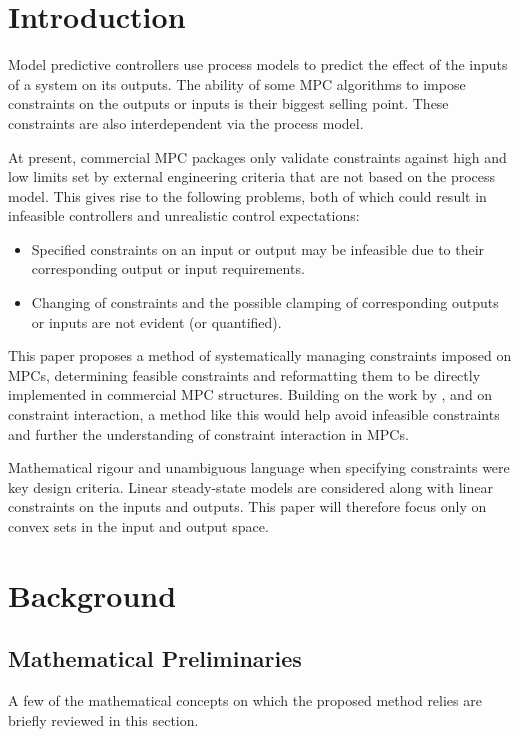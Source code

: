\documentclass[final,authoryear,5pt,times,twocolumn]{elsarticle}
\begin{document}


\section{Introduction}\label{sec:intro}
Model predictive controllers use process models to predict the effect of the inputs of a system on its outputs.
The ability of some MPC algorithms to impose constraints on the outputs or inputs is their biggest selling point.
These constraints are also interdependent via the process model.

At present, commercial MPC packages only validate constraints against high and low limits set by external engineering criteria that are not based on the process model.
This gives rise to the following problems, both of which could result in infeasible controllers and unrealistic control expectations:
\begin{itemize}
  \item Specified constraints on an input or output may be infeasible due to their corresponding output or input requirements.
  \item Changing of constraints and the possible clamping of corresponding outputs or inputs are not evident (or quantified).
\end{itemize}

This paper proposes a method of systematically managing constraints imposed on MPCs, determining feasible constraints and reformatting them to be directly implemented in commercial MPC structures.
Building on the work by \citet{vinsonartoi}, \citet{opconproc} and \citet{limaphd} on constraint interaction, a method like this would help avoid infeasible constraints and further the understanding of constraint interaction in MPCs.

Mathematical rigour and unambiguous language when specifying constraints were key design criteria.
Linear steady-state models are considered along with linear constraints on the inputs and outputs.
This paper will therefore focus only on convex sets in the input and output space.


\section{Background}\label{sec:background}
\subsection{Mathematical Preliminaries}
A few of the mathematical concepts on which the proposed method relies are briefly reviewed in this section.
\end{document}
